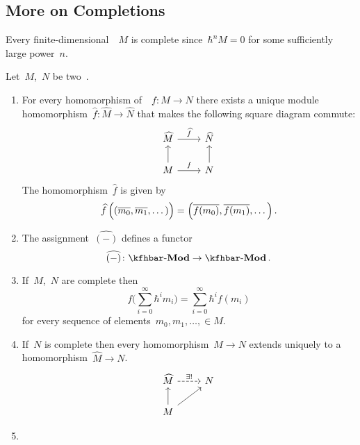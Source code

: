 \documentclass[a4paper, 11pt, oneside]{scrartcl}
\begin{document}
\subsection{More on Completions}

\begin{example}
  Every finite-dimensional~\module{$\kfhbar$}~$M$ is complete since~$\hbar^n M = 0$ for some sufficiently large power~$n$.
\end{example}

\begin{proposition}
  Let~$M$,~$N$ be two~\modules{$\kfhbar$}.
  \begin{enumerate}
    \item
      For every homomorphism of~\module{$\kfhbar$}~$f \colon M \to N$ there exists a unique module homomorphism~$\widehat{f} \colon \widehat{M} \to \widehat{N}$ that makes the following square diagram commute:
      \[
        \begin{tikzcd}
          \widehat{M}
          \arrow{r}[above]{\widehat{f}}
          &
          \widehat{N}
          \\
          M
          \arrow{u}
          \arrow{r}[above]{f}
          &
          N
          \arrow{u}
        \end{tikzcd}
      \]
      The homomorphism~$\widehat{f}$ is given by
      \[
        \widehat{f} \, \Bigl( (\overline{m_0}, \overline{m_1}, \dotsc) \Bigr)
        =
        \Bigl( \overline{f(m_0)}, \overline{f(m_1)}, \dotsc \Bigr) \,.
      \]
    \item
      The assignment~$\widehat{(-)}$ defines a functor
      \[
        \widehat{(-)}
        \colon
        \Mod{\kfhbar}
        \to
        \Mod{\kfhbar} \,.
      \]
    \item
      If~$M$,~$N$ are complete then
      \[
        f\Biggl( \sum_{i=0}^\infty \hbar^i m_i \Biggr)
        =
        \sum_{i=0}^\infty \hbar^i f(m_i)
      \]
      for every sequence of elements~$m_0, m_1, \dotsc, \in M$.
    \item
      If~$N$ is complete then every homomorphism~$M \to N$ extends uniquely to a homomorphism~$\widehat{M} \to N$.
      \[
        \begin{tikzcd}
          \widehat{M}
          \arrow[dashed]{r}[above]{\exists!}
          &
          N
          \\
          M
          \arrow{u}
          \arrow{ur}
          &
          {}
        \end{tikzcd}
      \]
    \item

\end{enumerate}
\end{proposition}
\end{document}
